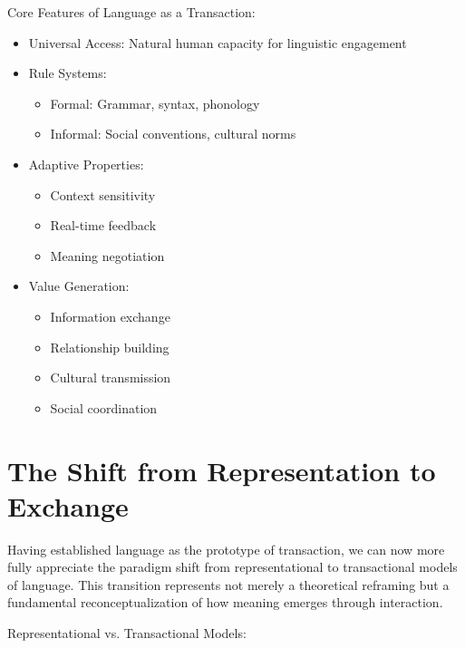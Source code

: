 \documentclass[12pt]{article}
\begin{document}
Core Features of Language as a Transaction:
\begin{itemize}
\item Universal Access: Natural human capacity for linguistic engagement
\item Rule Systems:
  \begin{itemize}
  \item Formal: Grammar, syntax, phonology
  \item Informal: Social conventions, cultural norms
  \end{itemize}
\item Adaptive Properties:
  \begin{itemize}
  \item Context sensitivity
  \item Real-time feedback
  \item Meaning negotiation
  \end{itemize}
\item Value Generation:
  \begin{itemize}
  \item Information exchange
  \item Relationship building
  \item Cultural transmission
  \item Social coordination
  \end{itemize}
\end{itemize}

\section{The Shift from Representation to Exchange}

Having established language as the prototype of transaction, we can now more fully appreciate the paradigm shift from representational to transactional models of language. This transition represents not merely a theoretical reframing but a fundamental reconceptualization of how meaning emerges through interaction.

Representational vs. Transactional Models:
\end{document}
